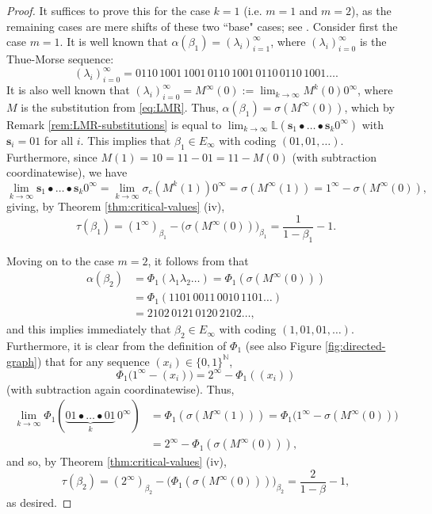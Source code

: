 \documentclass[12pt]{amsart}
\theoremstyle{definition}
\theoremstyle{remark}
\numberwithin{equation}{section}
\newcommand{\N}{\ensuremath{\mathbb{N}}}
\renewcommand{\L}{\ensuremath{\mathbb{L}}}
\newcommand{\s}{ {\mathbf{s}}}
\newcommand{\la}{\lambda}
\newcommand{\f}{\infty}
\newcommand{\al}{\alpha}
\newcommand{\si}{\sigma}
\begin{document}
{\begin{proof}
It suffices to prove this for the case $k=1$ (i.e. $m=1$ and $m=2$), as the remaining cases are mere shifts of these two ``base" cases; see \cite{Komornik_Loreti_2002}. Consider first the case $m=1$. It is well known that $\al(\beta_1)=(\la_i)_{i=1}^\f$, where $(\lambda_i)_{i=0}^\f$ is the Thue-Morse sequence:
\[
(\lambda_i)_{i=0}^\f= 0110\,1001\,1001\,0110\,1001\,0110\,0110\,1001\dots.
\]
It is also well known that $(\lambda_i)_{i=0}^\f=M^\f(0):=\lim_{k\to\f}M^k(0)0^\f$, where $M$ is the substitution from \eqref{eq:LMR}. Thus, $\al(\beta_1)=\si(M^\f(0))$, which by Remark \ref{rem:LMR-substitutions} is equal to $\lim_{k\to\f}\L(\s_1\bullet\dots\bullet \s_k 0^\f)$ with $\s_i=01$ for all $i$. This implies that $\beta_1\in E_\f$ with coding $(01,01,\dots)$. Furthermore, since $M(1)=10=11-01=11-M(0)$ (with subtraction coordinatewise), we have
\[
\lim_{k\to\f}\s_1\bullet\dots\bullet\s_k 0^\f=\lim_{k\to\f}\si_c(M^k(1))0^\f=\si(M^\f(1))=1^\f-\si(M^\f(0)),
\]
giving, by Theorem \ref{thm:critical-values} (iv),
\[
\tau(\beta_1)=(1^\f)_{\beta_1}-\big(\si(M^\f(0))\big)_{\beta_1}=\frac{1}{1-\beta_1}-1.
\]

Moving on to the case $m=2$, it follows from \cite[Lemma 5.3]{Komornik_Loreti_2002} that 
\begin{align*}
\al(\beta_2)&=\Phi_1(\lambda_1\lambda_2\dots)=\Phi_1(\si(M^\f(0)))\\
&=\Phi_1(1101\,0011\,0010\,1101\dots)\\
&=2102\,0121\,0120\,2102\dots,
\end{align*}
and this implies immediately that $\beta_2\in E_\f$ with coding $(1,01,01,\dots)$. Furthermore, it is clear from the definition of $\Phi_1$ (see also Figure \ref{fig:directed-graph}) that for any sequence $(x_i)\in\{0,1\}^\N$,
\[
\Phi_1\big(1^\f-(x_i)\big)=2^\f-\Phi_1((x_i))
\]
(with subtraction again coordinatewise). Thus,
\begin{align*}
\lim_{k\to\f}\Phi_1(\underbrace{01\bullet\dots\bullet 01}_{k}\,0^\f)&=\Phi_1(\si(M^\f(1)))=\Phi_1\big(1^\f-\si(M^\f(0))\big)\\
&=2^\f-\Phi_1(\si(M^\f(0))),
\end{align*}
and so, by Theorem \ref{thm:critical-values} (iv),
\[
\tau(\beta_2)=(2^\f)_{\beta_2}-\big(\Phi_1(\si(M^\f(0)))\big)_{\beta_2}=\frac{2}{1-\beta}-1,
\]
as desired.
\end{proof}

}
\end{document}
